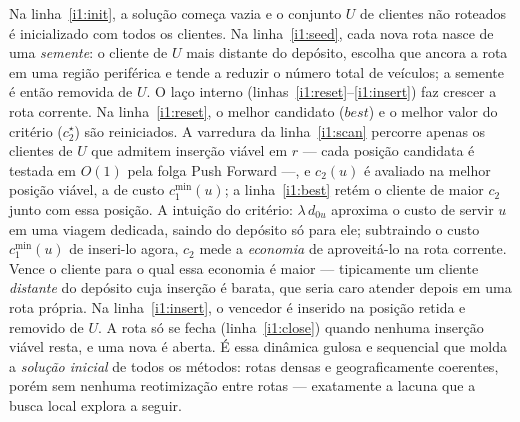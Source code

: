 \documentclass[12pt, a4paper]{article}
\begin{document}
\begin{algorithm}[H]
\caption{\textsc{I1-Solomon} --- construção por inserção sequencial}\label{alg:i1}
\begin{algorithmic}[1]
\label{i1:init}
  \label{i1:seed}
  \REPEAT
    \label{i1:reset}
    \label{i1:scan}
        \label{i1:best}
      \ENDIF
    \ENDFOR
      \label{i1:insert}
    \ENDIF
  \label{i1:close}
\ENDWHILE
{}
\end{algorithmic}
\end{algorithm}

 Na linha~\ref{i1:init}, a solução começa vazia e o conjunto $U$ de clientes não roteados é inicializado com todos os clientes. Na linha~\ref{i1:seed}, cada nova rota nasce de uma \emph{semente}: o cliente de $U$ mais distante do depósito, escolha que ancora a rota em uma região periférica e tende a reduzir o número total de veículos; a semente é então removida de $U$. O laço interno (linhas~\ref{i1:reset}--\ref{i1:insert}) faz crescer a rota corrente. Na linha~\ref{i1:reset}, o melhor candidato ($best$) e o melhor valor do critério ($c_2^\star$) são reiniciados. A varredura da linha~\ref{i1:scan} percorre apenas os clientes de $U$ que admitem inserção viável em $r$ --- cada posição candidata é testada em $O(1)$ pela folga Push Forward ---, e $c_2(u)$ é avaliado na melhor posição viável, a de custo $c_1^{\min}(u)$; a linha~\ref{i1:best} retém o cliente de maior $c_2$ junto com essa posição. A intuição do critério: $\lambda\,d_{0u}$ aproxima o custo de servir $u$ em uma viagem dedicada, saindo do depósito só para ele; subtraindo o custo $c_1^{\min}(u)$ de inseri-lo agora, $c_2$ mede a \emph{economia} de aproveitá-lo na rota corrente. Vence o cliente para o qual essa economia é maior --- tipicamente um cliente \emph{distante} do depósito cuja inserção é barata, que seria caro atender depois em uma rota própria. Na linha~\ref{i1:insert}, o vencedor é inserido na posição retida e removido de $U$. A rota só se fecha (linha~\ref{i1:close}) quando nenhuma inserção viável resta, e uma nova é aberta. É essa dinâmica gulosa e sequencial que molda a \emph{solução inicial} de todos os métodos: rotas densas e geograficamente coerentes, porém sem nenhuma reotimização entre rotas --- exatamente a lacuna que a busca local explora a seguir.
\end{document}
